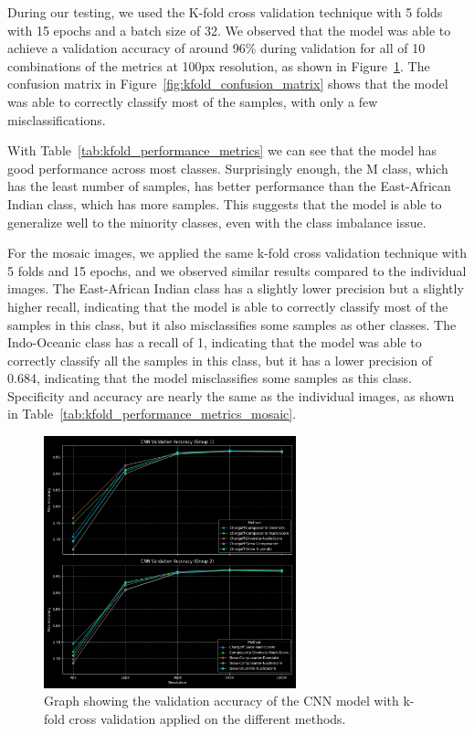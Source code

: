 During our testing, we used the K-fold cross validation technique with 5 folds with 15 epochs and a batch size of 32. We observed that the model
was able to achieve a validation accuracy of around 96\% during validation for all of 10 combinations of the metrics at 100px resolution, as shown in
Figure~\ref{fig:kfold_accuracy}. The confusion matrix in Figure~\ref{fig:kfold_confusion_matrix} shows that the model was able to correctly classify
most of the samples, with only a few misclassifications.

With Table~\ref{tab:kfold_performance_metrics} we can see that the model has good performance across most classes. Surprisingly enough, the M class,
which has the least number of samples, has better performance than the East-African Indian class, which has more samples. This suggests that the model
is able to generalize well to the minority classes, even with the class imbalance issue.

For the mosaic images, we applied the same k-fold cross validation technique with 5 folds and 15 epochs, and we observed similar results compared to the
individual images. The East-African Indian class has a slightly lower precision but a slightly higher recall, indicating that the model is able to
correctly classify most of the samples in this class, but it also misclassifies some samples as other classes. The Indo-Oceanic class has a recall of 1,
indicating that the model was able to correctly classify all the samples in this class, but it has a lower precision of 0.684, indicating that the model
misclassifies some samples as this class. Specificity and accuracy are nearly the same as the individual images, as shown in
Table~\ref{tab:kfold_performance_metrics_mosaic}.

\begin{figure}[H]
	\centering
	\includegraphics[width=0.65\textwidth]{../imgs/graphs/kfold/cnn_validation_accuracy_groups_mask_5_kfold_std.png}
	\caption{Graph showing the validation accuracy of the CNN model with k-fold cross validation applied on the different methods.}
	\label{fig:kfold_accuracy}
\end{figure}

